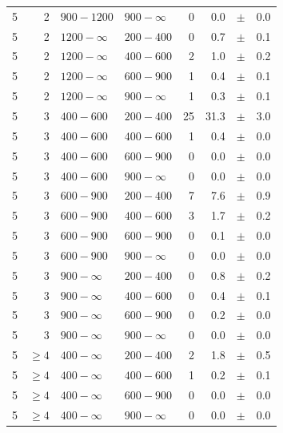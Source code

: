 \begin{table}[!t]
\begin{tabular}{rrllrrcl}
5 & 2 & $ 900-1200$ & $900-\infty$ &      0 &      0.0 &$\pm$&    0.0 \\
5 & 2 & $1200- \infty$ & $200-400$ &      0 &      0.7 &$\pm$&    0.1 \\
5 & 2 & $1200- \infty$ & $400-600$ &      2 &      1.0 &$\pm$&    0.2 \\
5 & 2 & $1200- \infty$ & $600-900$ &      1 &      0.4 &$\pm$&    0.1 \\
5 & 2 & $1200- \infty$ & $900-\infty$ &      1 &      0.3 &$\pm$&    0.1 \\
5 & 3 & $ 400- 600$ & $200-400$ &     25 &     31.3 &$\pm$&    3.0 \\
5 & 3 & $ 400- 600$ & $400-600$ &      1 &      0.4 &$\pm$&    0.0 \\
5 & 3 & $ 400- 600$ & $600-900$ &      0 &      0.0 &$\pm$&    0.0 \\
5 & 3 & $ 400- 600$ & $900-\infty$ &      0 &      0.0 &$\pm$&    0.0 \\
5 & 3 & $ 600- 900$ & $200-400$ &      7 &      7.6 &$\pm$&    0.9 \\
5 & 3 & $ 600- 900$ & $400-600$ &      3 &      1.7 &$\pm$&    0.2 \\
5 & 3 & $ 600- 900$ & $600-900$ &      0 &      0.1 &$\pm$&    0.0 \\
5 & 3 & $ 600- 900$ & $900-\infty$ &      0 &      0.0 &$\pm$&    0.0 \\
5 & 3 & $ 900- \infty$ & $200-400$ &      0 &      0.8 &$\pm$&    0.2 \\
5 & 3 & $ 900- \infty$ & $400-600$ &      0 &      0.4 &$\pm$&    0.1 \\
5 & 3 & $ 900- \infty$ & $600-900$ &      0 &      0.2 &$\pm$&    0.0 \\
5 & 3 & $ 900- \infty$ & $900-\infty$ &      0 &      0.0 &$\pm$&    0.0 \\
5 & $\geq 4$ & $ 400- \infty$ & $200-400$ &      2 &      1.8 &$\pm$&    0.5 \\
5 & $\geq 4$ & $ 400- \infty$ & $400-600$ &      1 &      0.2 &$\pm$&    0.1 \\
5 & $\geq 4$ & $ 400- \infty$ & $600-900$ &      0 &      0.0 &$\pm$&    0.0 \\
5 & $\geq 4$ & $ 400- \infty$ & $900-\infty$ &      0 &      0.0 &$\pm$&    0.0 \\
    \hline
  \end{tabular}
\end{table}

